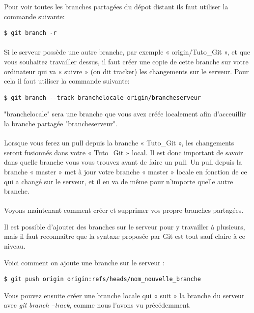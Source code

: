 \documentclass[french, a4paper, 12pt, titlepage]{article}
\begin{document}
Pour voir toutes les branches partagées du dépot distant ils faut utiliser la commande suivante:
\begin{lstlisting}
$ git branch -r
\end{lstlisting}

\paragraph{}Si le serveur possède une autre branche, par exemple « origin/Tuto\_Git », et que vous souhaitez travailler dessus, il faut créer une copie de cette branche sur votre ordinateur qui va « suivre » (on dit tracker) les changements sur le serveur. Pour cela il faut utiliser la commande suivante:
\begin{lstlisting}
$ git branch --track branchelocale origin/brancheserveur
\end{lstlisting}
"branchelocale" sera une branche que vous avez créée localement afin d'acceuillir la branche partagée "brancheserveur".

\paragraph{}Lorsque vous ferez un pull depuis la branche « Tuto\_Git », les changements seront fusionnés dans votre « Tuto\_Git » local. Il est donc important de savoir dans quelle branche vous vous trouvez avant de faire un pull. Un pull depuis la branche « master » met à jour votre branche « master » locale en fonction de ce qui a changé sur le serveur, et il en va de même pour n’importe quelle autre branche.

\paragraph{}Voyons maintenant comment créer et supprimer vos propre branches partagées.

Il est possible d’ajouter des branches sur le serveur pour y travailler à plusieurs, mais il faut reconnaître que la syntaxe proposée par Git est tout sauf claire à ce niveau.

Voici comment on ajoute une branche sur le serveur :
\begin{lstlisting}
$ git push origin origin:refs/heads/nom_nouvelle_branche
\end{lstlisting}
Vous pouvez ensuite créer une branche locale qui « suit » la branche du serveur avec \emph{git branch --track}, comme nous l’avons vu précédemment.
\end{document}
